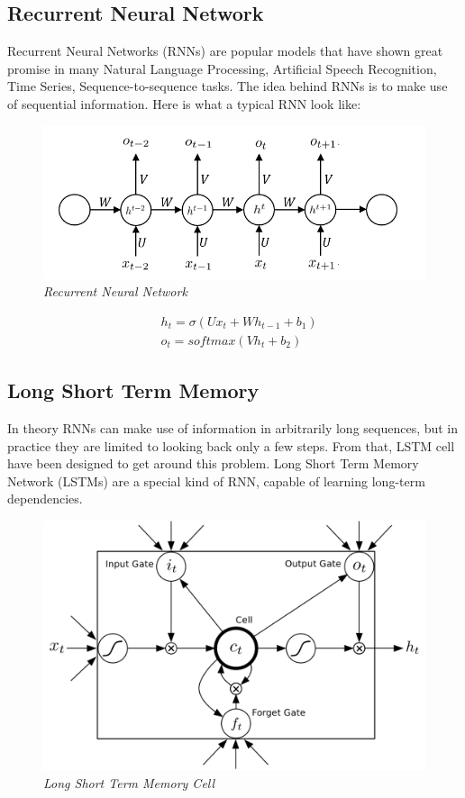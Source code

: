 \documentclass[conference]{IEEEtran}
\begin{document}
\subsection{Recurrent Neural Network}
Recurrent Neural Networks (RNNs) are popular models that have shown great promise in many Natural Language Processing, Artificial Speech Recognition, Time Series, Sequence-to-sequence tasks. The idea behind RNNs is to make use of sequential information. Here is what a typical RNN look like:
\begin{figure}[h]
\includegraphics[scale=0.5]{rnn.png}
\centering
\caption{\textit{Recurrent Neural Network}}
\end{figure}
\begin{align*}
	&h_t = \sigma(Ux_t + Wh_{t-1} + b_1)\\
	&o_t = softmax(Vh_t + b_2)
\end{align*}


\subsection{Long Short Term Memory}
In theory RNNs can make use of information in arbitrarily long sequences, but in practice they are limited to looking back only a few steps. From that, LSTM cell have been designed to get around this problem. Long Short Term Memory Network (LSTMs) are a special kind of RNN, capable of learning long-term dependencies.

\begin{figure}[h]
\includegraphics[scale=0.5]{lstm.png}
\centering
\caption{\textit{Long Short Term Memory Cell}}
\end{figure}
\end{document}
